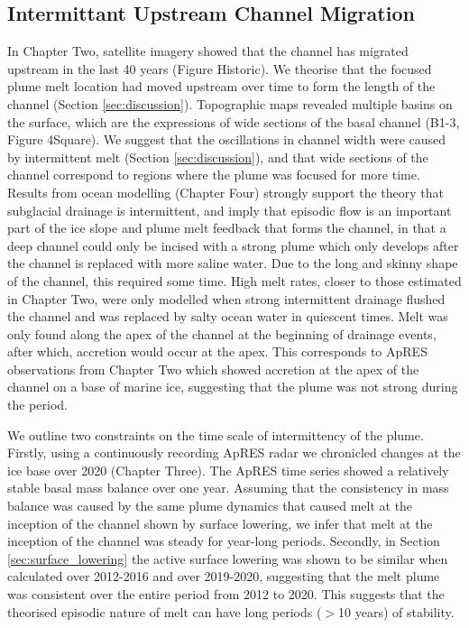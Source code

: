 \subsection{Intermittant Upstream Channel Migration}

In Chapter Two, satellite imagery showed that the channel has migrated upstream in the last 40 years (Figure Historic).  We theorise that the focused plume melt location had moved upstream over time to form the length of the channel (Section \ref{sec:discussion}). Topographic maps revealed multiple basins on the surface, which are the expressions of wide sections of the basal channel (B1-3, Figure 4Square). We suggest that the oscillations in channel width were  caused by intermittent melt (Section \ref{sec:discussion}), and that wide sections of the channel correspond to regions where the plume was focused for more time.
Results from ocean modelling (Chapter Four) strongly support the theory that subglacial drainage is intermittent, and imply that episodic flow is an important part of the ice slope and plume melt feedback that forms the channel, in that a deep channel could only be incised with a strong plume which only develops after the channel is replaced with more saline water. Due to the long and skinny shape of the channel, this required some time.  High melt rates, closer to those estimated in Chapter Two, were only modelled when strong intermittent drainage flushed the channel and was replaced by salty ocean water in quiescent times. 
Melt was only found along the apex of the channel at the beginning of drainage events, after which, accretion would occur at the apex. This corresponds to ApRES observations from Chapter Two which showed accretion at the apex of the channel on a base of marine ice, suggesting that the plume was not strong during the period. 

We outline two constraints on the time scale of intermittency of the plume. Firstly, using a continuously recording ApRES radar we chronicled changes at the ice base over 2020 (Chapter Three). The ApRES time series showed a relatively stable basal mass balance over one year. Assuming that the consistency in mass balance was caused by the same plume dynamics that caused melt at the inception of the channel shown by surface lowering, we infer that melt at the inception of the channel was steady for year-long periods. Secondly, in Section \ref{sec:surface_lowering} the active surface lowering was shown to be similar when calculated over 2012-2016 and over 2019-2020, suggesting that the melt plume was consistent over the entire period from 2012 to 2020. This suggests that the theorised episodic nature of melt can have long periods ($>$10 years) of stability.

